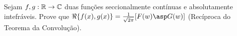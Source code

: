 \linespread{1.5}
Sejam $f,g:\mathbb{R} \rightarrow \mathbb{C}$ duas funções seccionalmente contínuas e absolutamente intefráveis. Prove que $\Re\{f(x), g(x)\} = \frac{1}{\sqrt{2\pi}}[F(w)\asp G(w)]$ (Recíproca do Teorema da Convolução).